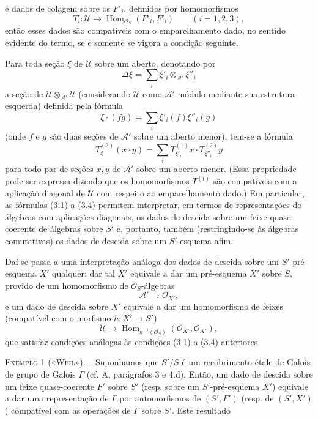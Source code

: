 \documentclass[11pt,twoside,openany]{book}
\numberwithin{equation}{section}
\newcommand{\src}[1]{%
  \phantomsection\hypertarget{src:#1}{}%
  \marginpar{\raggedleft\footnotesize\sffamily #1}%
}
\theoremstyle{plain}
\theoremstyle{definition}
\theoremstyle{remark}
\newcommand{\FgaUnitKey}{frontmatter}
\renewcommand{\src}[1]{%
  \phantomsection\hypertarget{src:\FgaUnitKey:#1}{}%
  \marginpar{\raggedleft\footnotesize\sffamily #1}%
}
\begin{document}
\src{320}
e dados de colagem sobre os $F'_i$, definidos por homomorfismos
\[
  T_i:\mathcal U\longrightarrow
  \operatorname{Hom}_{\mathcal O_S}(F'_i,F'_i)
  \qquad (i=1,2,3),
\]
então esses dados são compatíveis com o emparelhamento dado, no sentido
evidente do termo, se e somente se vigora a condição seguinte.

Para toda seção $\xi$ de $\mathcal U$ sobre um aberto, denotando por
\[
  \Delta\xi=\sum_i\xi'_i\otimes_{\mathcal A'}\xi''_i
\]
a seção de $\mathcal U\otimes_{\mathcal A'}\mathcal U$ (considerando
$\mathcal U$ como $\mathcal A'$-módulo mediante sua estrutura esquerda)
definida pela fórmula
\[
  \xi\mathbin{\cdot}(fg)=\sum_i\xi'_i(f)\xi''_i(g)
\]
(onde $f$ e $g$ são duas seções de $\mathcal A'$ sobre um aberto menor),
tem-se a fórmula
\begin{equation}
  T^{(3)}_\xi(x\mathbin{\cdot}y)
  =\sum_iT^{(1)}_{\xi'_i}x\mathbin{\cdot}T^{(2)}_{\xi''_i}y
  \tag{3.4}
\end{equation}
para todo par de seções $x,y$ de $\mathcal A'$ sobre um aberto menor.
(Essa propriedade pode ser expressa
dizendo que os homomorfismos $T^{(i)}$ são compatíveis com a aplicação
diagonal de $\mathcal U$ com respeito ao emparelhamento dado.) Em particular, as
fórmulas (3.1) a (3.4) permitem interpretar, em termos de representações de
álgebras com aplicações diagonais, os dados de descida sobre um feixe
quase-coerente de álgebras sobre $S'$ e, portanto, também (restringindo-se às
álgebras comutativas) os dados de descida sobre um $S'$-esquema afim.

Daí se passa a uma interpretação análoga dos dados de descida sobre um
$S'$-pré-esquema $X'$ qualquer: dar tal $X'$ equivale a dar um pré-esquema
$X'$ sobre $S$, provido de um homomorfismo de $\mathcal O_S$-álgebras
\[
  \mathcal A'\longrightarrow\mathcal O_{X'},
\]
e um dado de descida sobre $X'$ equivale a dar um homomorfismo de feixes
(compatível com o morfismo $h:X'\longrightarrow S'$)
\[
  \mathcal U\longrightarrow
  \operatorname{Hom}_{h^{-1}(\mathcal O_S)}
  (\mathcal O_{X'},\mathcal O_{X'}),
\]
que satisfaz condições análogas às condições (3.1) a (3.4) anteriores.

\textsc{Exemplo 1 («Weil»).} -- Suponhamos que $S'/S$ é um recobrimento étale
de Galois de grupo de Galois $\Gamma$ (cf. A, parágrafos 3 e 4.d). Então, um
dado de descida sobre um feixe quase-coerente $F'$ sobre $S'$ (resp. sobre um
$S'$-pré-esquema $X'$) equivale a dar uma representação de $\Gamma$ por
automorfismos de $(S',F')$ (resp. de $(S',X')$) compatível com as operações
de $\Gamma$ sobre $S'$. Este resultado
\end{document}
